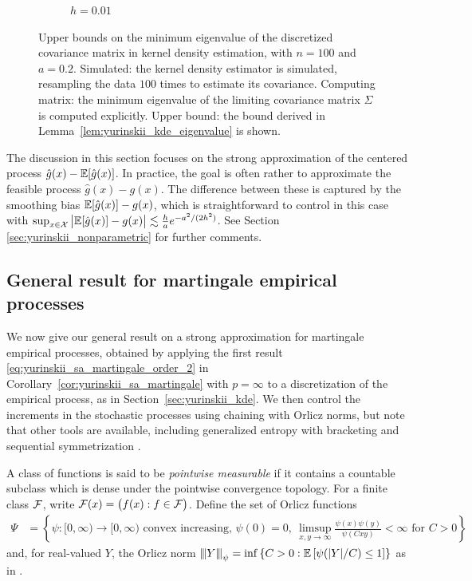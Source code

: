 \begin{figure}[t]
\begin{subfigure}{0.49\textwidth}
    \caption{$h = 0.01$}
  \end{subfigure}
  \caption[Minimum eigenvalue of the kernel density covariance matrix]{
    Upper bounds on the minimum eigenvalue of the discretized covariance
    matrix in kernel density estimation,
    with $n=100$ and $a = 0.2$.
    Simulated: the kernel density estimator is simulated,
    resampling the data $100$ times
    to estimate its covariance.
    Computing matrix: the minimum eigenvalue of the limiting covariance
    matrix $\Sigma$ is computed explicitly.
    Upper bound: the bound derived in
    Lemma~\ref{lem:yurinskii_kde_eigenvalue}
    is shown.
  }
  \label{fig:yurinskii_min_eig}
\end{figure}

The discussion in this section focuses on the strong approximation of the
centered process $\hat g(x)-\mathbb{E} [ \hat g(x) ]$. In practice, the goal is often
rather to approximate the feasible process $\hat g(x)- g(x)$. The difference
between these is captured by the smoothing bias $\mathbb{E} [ \hat g(x) ] - g(x)$,
which is straightforward to control in this case with
$\sup_{x \in \mathcal{X}} \big| \mathbb{E} [ \hat g(x) ] - g(x) \big|
\lesssim \frac{h}{a} e^{-a^2 / (2 h^2)}$.
See Section \ref{sec:yurinskii_nonparametric} for further
comments.

\subsection{General result for martingale empirical processes}

We now give our general result on a strong approximation for
martingale empirical processes, obtained by applying
the first result \eqref{eq:yurinskii_sa_martingale_order_2} in
Corollary~\ref{cor:yurinskii_sa_martingale} with $p=\infty$
to a discretization of the empirical process,
as in Section~\ref{sec:yurinskii_kde}.
We then control the increments in the stochastic processes
using chaining with Orlicz norms,
but note that other tools are available,
including generalized entropy with bracketing \citep{geer2000empirical}
and sequential symmetrization \citep{rakhlin2015sequential}.

A class of functions is said to be \emph{pointwise measurable}
if it contains a countable subclass which is dense under
the pointwise convergence topology.
For a finite class $\mathcal{F}$, write
$\mathcal{F}(x) = \big(f(x) : f \in \mathcal{F}\big)$.
Define the set of Orlicz functions
%
\begin{align*}
  \Psi
  &=
  \left\{
    \psi: [0, \infty) \to [0, \infty)
    \text{ convex increasing, }
    \psi(0) = 0,\
    \limsup_{x,y \to \infty} \tfrac{\psi(x) \psi(y)}{\psi(C x y)} < \infty
    \text{ for } C > 0
  \right\}
\end{align*}
%
and, for real-valued $Y$, the Orlicz norm
${\vert\kern-0.25ex\vert\kern-0.25ex\vert} Y {\vert\kern-0.25ex\vert\kern-0.25ex\vert}_\psi
= \inf
\left\{ C > 0:
  \mathbb{E} \left[ \psi(|Y|/C) \leq 1 \right]
\right\}$
as in \citet[Section~2.2]{van1996weak}.


